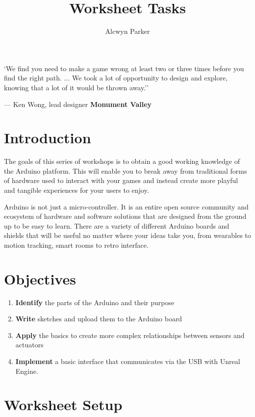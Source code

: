 \documentclass{../../../fal_assignment}
\title{Worksheet Tasks}
\author{Alcwyn Parker} %
\begin{document}
\maketitle

\begin{marginquote}
`We find you need to make a game wrong at least two or three times before you find the right path. ...
We took a lot of opportunity to design and explore, knowing that a lot of it would be thrown away.''
\par --- Ken Wong, lead designer \textbf{Monument Valley}
\end{marginquote}


\section*{Introduction}
The goals of this series of workshops is to obtain a good working knowledge of the Arduino platform. This will enable you to break away from traditional forms of hardware used to interact with your games and instead create more playful and tangible experiences for your users to enjoy.

Arduino is not just a micro-controller. It is an entire open source community and ecosystem of hardware and software solutions that are designed from the ground up to be easy to learn. There are a variety of different Arduino boards and shields that will be useful no matter where your ideas take you, from wearables to motion tracking, smart rooms to retro interface. 

\section*{Objectives}
\begin{enumerate}[label=(\Alph*)]
	\item \textbf{Identify} the parts of the Arduino and their purpose 
	\item \textbf{Write} sketches and upload them to the Arduino board
	\item \textbf{Apply} the basics to create more complex relationships between sensors and actuators
	\item \textbf{Implement} a basic interface that communicates via the USB with Unreal Engine.
\end{enumerate}

\section*{Worksheet Setup}
\end{document}
